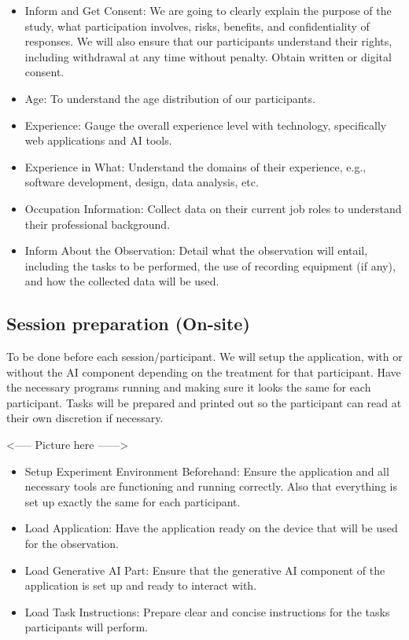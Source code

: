 \begin{itemize}
    \item Inform and Get Consent: We are going to clearly explain the purpose of the study, what participation involves, risks, benefits, and confidentiality of responses. We will also ensure that our participants understand their rights, including withdrawal at any time without penalty. Obtain written or digital consent.
\end{itemize}
\begin{itemize}
    \item Age: To understand the age distribution of our participants.
    \item Experience: Gauge the overall experience level with technology, specifically web applications and AI tools.
    \item Experience in What: Understand the domains of their experience, e.g., software development, design, data analysis, etc.
    \item Occupation Information: Collect data on their current job roles to understand their professional background.
    \item Inform About the Observation: Detail what the observation will entail, including the tasks to be performed, the use of recording equipment (if any), and how the collected data will be used.
\end{itemize}

\subsection{Session preparation (On-site)}
To be done before each session/participant. We will setup the application, with or without the AI component depending on the treatment for that participant. Have the necessary programs running and making sure it looks the same for each participant. Tasks will be prepared and printed out so the participant can read at their own discretion if necessary.

<----- Picture here ------>

\begin{itemize}
    \item Setup Experiment Environment Beforehand: Ensure the application and all necessary tools are functioning and running correctly. Also that everything is set up exactly the same for each participant.
    \item Load Application: Have the application ready on the device that will be used for the observation.
    \item Load Generative AI Part: Ensure that the generative AI component of the application is set up and ready to interact with.
    \item Load Task Instructions: Prepare clear and concise instructions for the tasks participants will perform.
\end{itemize}

